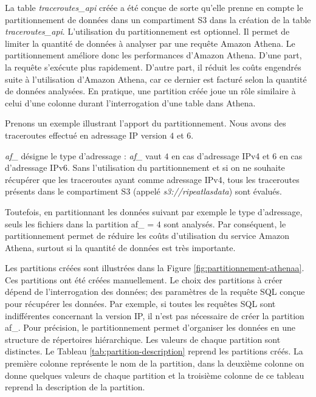 La table \textit{traceroutes\_api} créée a été conçue de sorte qu'elle prenne en compte  le partitionnement de données dans un compartiment S3 dans la création de la table \textit{traceroutes\_api}.  L'utilisation du partitionnement est optionnel. 
Il permet de limiter la quantité de données à analyser par une requête Amazon Athena. Le partitionnement améliore donc les performances d'Amazon Athena. D'une part, la requête s'exécute plus rapidement. D'autre part, il réduit les coûts engendrés  suite à l'utilisation d'Amazon Athena, car ce dernier est facturé selon la quantité de données analysées. En pratique,  une partition créée joue un rôle similaire à celui d'une colonne durant l'interrogation d'une table dans Athena. 

Prenons un exemple illustrant l'apport du partitionnement. Nous avons des traceroutes effectué en adressage IP  version  $ 4 $ et $ 6 $.


\textit{af\_} désigne le type d'adressage : \textit{af\_} vaut $4$ en cas d'adressage IPv4 et $6$ en cas d'adressage IPv6. Sans l'utilisation du partitionnement et si on ne souhaite récupérer que  les traceroutes ayant comme adressage IPv4, tous les traceroutes présents dans le compartiment S3 (appelé \textit{s3://ripeatlasdata}) sont évalués.

Toutefois, en partitionnant les données suivant par exemple le type d'adressage, seuls les fichiers dans la partition
af\_ = $4$  sont analysés. Par conséquent, le partitionnement permet de réduire les coûts d'utilisation du service Amazon Athena, surtout si la quantité de données est très importante. 


Les partitions   créées sont illustrées  dans la Figure 	\ref{fig:partitionnement-athenaa}. Ces partitions ont été créées manuellement. Le choix des partitions à créer  dépend de l'interrogation des données; des paramètres de la requête SQL conçue pour récupérer  les données. Par exemple, si toutes les requêtes SQL  sont indifférentes concernant la version IP, il n'est pas nécessaire de créer la partition af\_. Pour précision, le partitionnement permet  d'organiser les données en une structure de répertoires hiérarchique. Les valeurs de chaque partition sont distinctes.
Le  Tableau \ref{tab:partition-description} 
reprend les  partitions créés.  La première colonne représente le nom de la partition, dans 
la deuxième colonne on donne quelques valeurs de chaque partition et la troisième colonne de ce tableau reprend la description de la partition.

